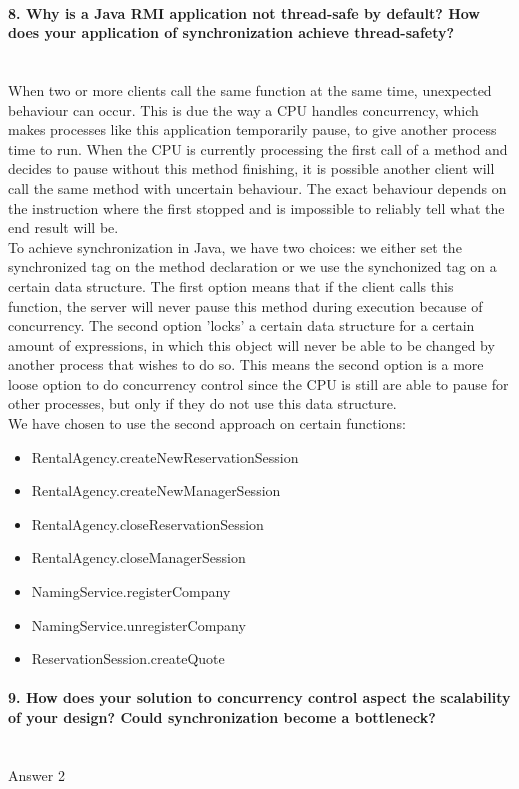 \documentclass{ds-report}
\begin{document}
	\paragraph{8. Why is a Java RMI application not thread-safe by default? How does your application of synchronization achieve thread-safety?} \mbox{}\\
When two or more clients call the same function at the same time, unexpected behaviour can occur. This is due the way a CPU handles concurrency, which makes processes like this application temporarily pause, to give another process time to run. When the CPU is currently processing the first call of a method and decides to pause without this method finishing, it is possible another client will call the same method with uncertain behaviour. The exact behaviour depends on the instruction where the first stopped and is impossible to reliably tell what the end result will be.\\
To achieve synchronization in Java, we have two choices: we either set the synchronized tag on the method declaration or we use the synchonized tag on a certain data structure. The first option means that if the client calls this function, the server will never pause this method during execution because of concurrency. The second option 'locks' a certain data structure for a certain amount of expressions, in which this object will never be able to be changed by another process that wishes to do so. This means the second option is a more loose option to do concurrency control since the CPU is still are able to pause for other processes, but only if they do not use this data structure.\\
We have chosen to use the second approach on certain functions:
\begin{itemize}
	\item RentalAgency.createNewReservationSession
	\item RentalAgency.createNewManagerSession
	\item RentalAgency.closeReservationSession
	\item RentalAgency.closeManagerSession
	\item NamingService.registerCompany
	\item NamingService.unregisterCompany
	\item ReservationSession.createQuote
\end{itemize} 


	\paragraph{9. How does your solution to concurrency control aspect the scalability of your design? Could
synchronization become a bottleneck?} \mbox{}\\
	Answer 2

	
	\clearpage
	
	
\end{document}
